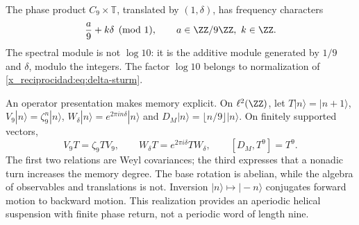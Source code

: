 The phase product \(C_9\times\mathbb T\), translated by \((1,\delta)\), has frequency characters
\[
 \frac a9+k\delta\pmod1,\qquad a\in\ZZ/9\ZZ,\ k\in\ZZ.
\]
The spectral module is not \(\log10\): it is the additive module generated by \(1/9\) and \(\delta\), modulo the integers. The factor \(\log10\) belongs to normalization of \eqref{x_reciprocidad:eq:delta-sturm}.

An operator presentation makes memory explicit. On \(\ell^2(\ZZ)\), let \(T|n\rangle=|n+1\rangle\), \(V_9|n\rangle=\zeta_9^n|n\rangle\), \(W_\delta|n\rangle=e^{2\pi i n\delta}|n\rangle\) and \(D_M|n\rangle=\lfloor n/9\rfloor|n\rangle\). On finitely supported vectors,
\begin{equation}
 V_9T=\zeta_9TV_9,\qquad
 W_\delta T=e^{2\pi i\delta}TW_\delta,\qquad
 [D_M,T^9]=T^9.
 \label{x_reciprocidad:eq:weyl-relojes}
\end{equation}
The first two relations are Weyl covariances; the third expresses that a nonadic turn increases the memory degree. The base rotation is abelian, while the algebra of observables and translations is not. Inversion \(|n\rangle\mapsto|-n\rangle\) conjugates forward motion to backward motion. This realization provides an aperiodic helical suspension with finite phase return, not a periodic word of length nine.


